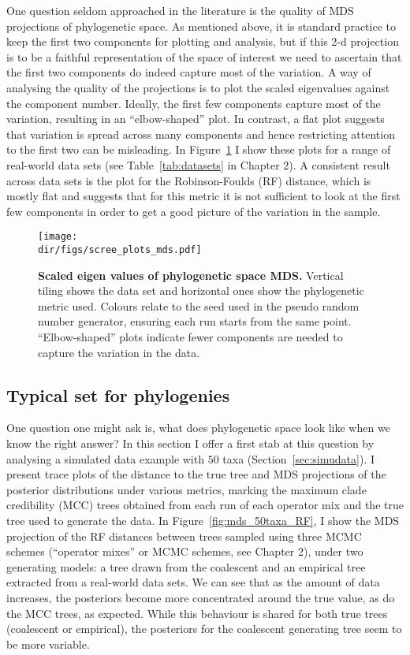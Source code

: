 One question seldom approached in the literature is the quality of MDS projections of phylogenetic space.
As mentioned above, it is standard practice to keep the first two components for plotting and analysis, but if this 2-d  projection is to be a faithful representation of the space of interest we need to ascertain that the first two components do indeed capture most of the variation.
A way of analysing the quality of the projections is to plot the scaled eigenvalues against the component number.
Ideally, the first few components capture most of the variation, resulting in an ``elbow-shaped'' plot.
In contrast, a flat plot suggests that variation is spread across many components and hence restricting attention to the first two can be misleading.
In Figure~\ref{fig:screeplots} I show these plots for a range of real-world data sets (see Table~\ref{tab:datasets} in Chapter 2).
A consistent result across data sets is the plot for the Robinson-Foulds (RF) distance, which is mostly flat and suggests that for this metric it is not sufficient to look at the first few components in order to get a good picture of the variation in the sample.

\begin{figure}[!ht]
\begin{center}
\texttt{[image: \\dir/figs/scree\_plots\_mds.pdf]} 
\end{center}
 \caption[Scaled eigen values of phylogenetic space MDS.]{\textbf{Scaled eigen values of phylogenetic space MDS.}
 Vertical tiling shows the data set and horizontal ones show the phylogenetic metric used.
 Colours relate to the seed used in the pseudo random number generator, ensuring each run starts from the same point. 
 ``Elbow-shaped'' plots indicate fewer components are needed to capture the variation in the data.
 }
 \label{fig:screeplots}
\end{figure}

\subsection{Typical set for phylogenies}
\label{sec:typical}

One question one might ask is, what does phylogenetic space look like when we know the right answer?
In this section I offer a first stab at this question by analysing a simulated data example with $50$ taxa (Section~\ref{sec:simudata}).
I present trace plots of the distance to the true tree and MDS projections of the posterior distributions under various metrics, marking the maximum clade credibility (MCC) trees obtained from each run of each operator mix and the true tree used to generate the data.
In Figure~\ref{fig:mds_50taxa_RF}, I show the MDS projection of the RF distances between trees sampled using three MCMC schemes (``operator mixes'' or MCMC schemes, see Chapter 2), under two generating models: a tree drawn from the coalescent and an empirical tree extracted from a real-world data sets.
We can see that as the amount of data increases, the posteriors become more concentrated around the true value, as do the MCC trees, as expected.
While this behaviour is shared for both true trees (coalescent or empirical), the posteriors for the coalescent generating tree seem to be more variable.

